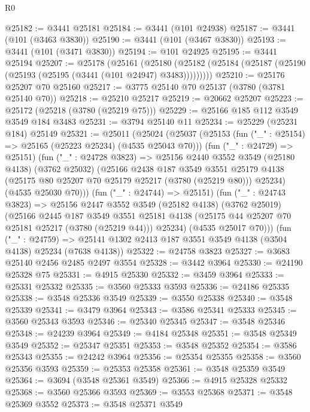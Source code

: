 \begin{lexlean}{R0}
\begin{coremodule}
@25182 := @3441 @25181
@25184 := @3441 (@101 @24938)
@25187 := @3441 (@101 (@3463 @3830))
@25190 := @3441 (@101 (@3467 @3830))
@25193 := @3441 (@101 (@3471 @3830))
@25194 := @101 @24925
@25195 := @3441 @25194
@25207 := @25178
    (@25161
      (@25180 (@25182 (@25184 (@25187 (@25190 (@25193 (@25195 (@3441 (@101 @24947) @3483)))))))))
@25210 := @25176 @25207 @70 @25160
@25217 := @3775 @25140 @70 @25137 (@3780 (@3781 @25140 @70))
@25218 := @25210 @25217
@25219 := @20662 @25207
@25223 := @25172 (@25218 (@3780 (@25219 @75)))
@25229 := @25166 @185 @112 @3549 @3549 @184 @3483
@25231 := @3794 @25140 @11
@25234 := @25229 (@25231 @184) @25149
@25321 := @25011
    (@25024
      (@25037
        (@25153 (fun ("_" : @25154) => @25165 (@25223 @25234) (@4535 @25043 @70)))
        (fun ("_" : @24729) => @25151)
        (fun ("_" : @24728 @3823) =>
        @25156
          @2440
          @3552
          @3549
          (@25180 @4138)
          (@3762 @25032)
          (@25166
            @2438
            @187
            @3549
            @3551
            @25179
            @4138
            (@25175 @80 @25207 @70 @25179 @25217 (@3780 (@25219 @80)))
            @25234)
          (@4535 @25030 @70)))
      (fun ("_" : @24744) => @25151)
      (fun ("_" : @24743 @3823) =>
      @25156
        @2447
        @3552
        @3549
        (@25182 @4138)
        (@3762 @25019)
        (@25166
          @2445
          @187
          @3549
          @3551
          @25181
          @4138
          (@25175 @44 @25207 @70 @25181 @25217 (@3780 (@25219 @44)))
          @25234)
        (@4535 @25017 @70)))
    (fun ("_" : @24759) =>
    @25141 @1302 @2413 @187 @3551 @3549 @4138 (@3504 @4138) @25234 (@7638 @4138))
@25322 := @24758 @3823
@25327 := @3683 @25140 @2456 @2485 @2497 @3554
@25328 := @3442 @3964
@25330 := @24190 @25328 @75
@25331 := @4915 @25330
@25332 := @3459 @3964
@25333 := @25331 @25332
@25335 := @3560 @25333 @3593
@25336 := @24186 @25335
@25338 := @3548 @25336 @3549
@25339 := @3550 @25338
@25340 := @3548 @25339
@25341 := @3479 @3964
@25343 := @3586 @25341 @25333
@25345 := @3560 @25343 @3593
@25346 := @25340 @25345
@25347 := @3548 @25346
@25348 := @24239 @3964
@25349 := @4184 @25348
@25351 := @3548 @25349 @3549
@25352 := @25347 @25351
@25353 := @3548 @25352
@25354 := @3586 @25343
@25355 := @24242 @3964
@25356 := @25354 @25355
@25358 := @3560 @25356 @3593
@25359 := @25353 @25358
@25361 := @3548 @25359 @3549
@25364 := @3694 (@3548 @25361 @3549)
@25366 := @4915 @25328 @25332
@25368 := @3560 @25366 @3593
@25369 := @3553 @25368
@25371 := @3548 @25369 @3552
@25373 := @3548 @25371 @3549

\end{coremodule}
\end{lexlean}
